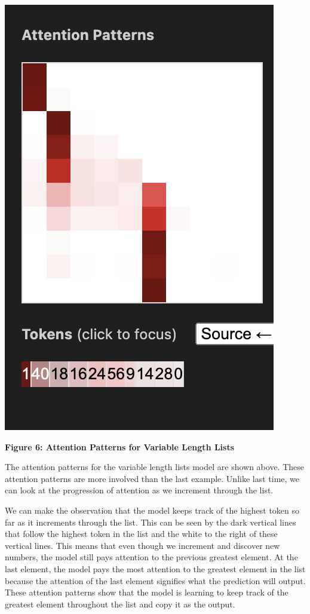 \documentclass{article}
\begin{document}
\begin{center}
    \includegraphics[scale=0.4]{images/att_variable3.png}

    \textbf{Figure 6: Attention Patterns for Variable Length Lists}
\end{center}

The attention patterns for the variable length lists model are shown above. These attention patterns are more involved than the last example. Unlike last time, we can look at the progression of attention as we increment through the list. 

We can make the observation that the model keeps track of the highest token so far as it increments through the list. This can be seen by the dark vertical lines that follow the highest token in the list and the white to the right of these vertical lines. This means that even though we increment and discover new numbers, the model still pays attention to the previous greatest element. At the last element, the model pays the most attention to the greatest element in the list because the attention of the last element signifies what the prediction will output. These attention patterns show that the model is learning to keep track of the greatest element throughout the list and copy it as the output.
\end{document}
